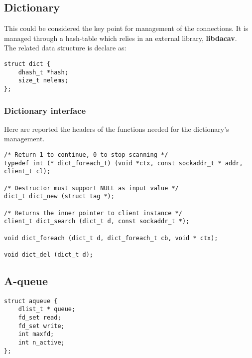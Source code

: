 \subsection{Dictionary}
This could be considered the key point for management of the connections. It is managed through a hash-table
which relies in an external library, \textbf{libdacav}.\\
The related data structure is declare as:
\begin{lstlisting}
struct dict {
    dhash_t *hash;
    size_t nelems;
};
\end{lstlisting}

\subsubsection{Dictionary interface}
Here are reported the headers of the functions needed for the dictionary's management.
\begin{lstlisting}
/* Return 1 to continue, 0 to stop scanning */
typedef int (* dict_foreach_t) (void *ctx, const sockaddr_t * addr,
client_t cl);

/* Destructor must support NULL as input value */
dict_t dict_new (struct tag *);

/* Returns the inner pointer to client instance */
client_t dict_search (dict_t d, const sockaddr_t *);

void dict_foreach (dict_t d, dict_foreach_t cb, void * ctx);

void dict_del (dict_t d);
\end{lstlisting}

\subsection{A-queue}

\begin{lstlisting}
struct aqueue {
    dlist_t * queue;
    fd_set read;
    fd_set write;
    int maxfd;
    int n_active;
};
\end{lstlisting}

